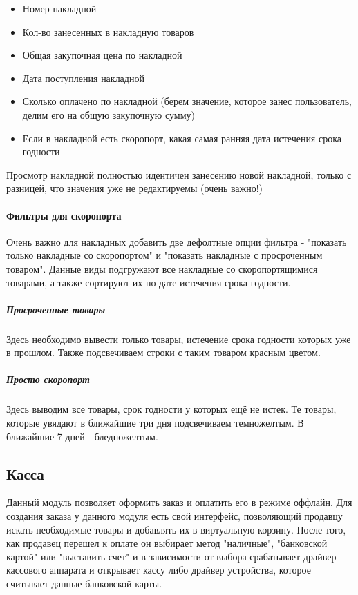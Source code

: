 \documentclass[DIV=calc, paper=a4, fontsize=11pt]{scrartcl} %
\begin{document}
\begin{itemize}
	\item Номер накладной
	\item Кол-во занесенных в накладную товаров
	\item Общая закупочная цена по накладной
	\item Дата поступления накладной
	\item Сколько оплачено по накладной (берем значение, которое занес пользователь, делим его на общую закупочную сумму)
	\item Если в накладной есть скоропорт, какая самая ранняя дата истечения срока годности
\end{itemize}

Просмотр накладной полностью идентичен занесению новой накладной, только с разницей, что значения уже не редактируемы (очень важно!)

\paragraph{Фильтры для скоропорта}
Очень важно для накладных добавить две дефолтные опции фильтра - "показать только накладные со скоропортом" и "показать накладные с просроченным товаром". Данные виды подгружают все накладные со скоропортящимися товарами, а также сортируют их по дате истечения срока годности. 

\subparagraph{Просроченные товары}
Здесь необходимо вывести только товары, истечение срока годности которых уже в прошлом. Также подсвечиваем строки с таким товаром красным цветом.

\subparagraph{Просто скоропорт}
Здесь выводим все товары, срок годности у которых ещё не истек. Те товары, которые увядают в ближайшие три дня подсвечиваем темножелтым. В ближайшие 7 дней - бледножелтым.

\subsection{Касса}

Данный модуль позволяет оформить заказ и оплатить его в режиме оффлайн. Для создания заказа у данного модуля есть свой интерфейс, позволяющий продавцу искать необходимые товары и добавлять их в виртуальную корзину. После того, как продавец перешел к оплате он выбирает метод "наличные", "банковской картой" или "выставить счет" и в зависимости от выбора срабатывает драйвер кассового аппарата и открывает кассу либо драйвер устройства, которое считывает данные банковской карты. 
\end{document}
